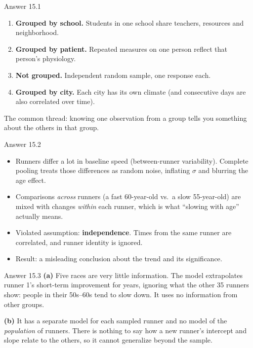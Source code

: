 \documentclass[aspectratio=43,11pt]{beamer}
\begin{document}
\begin{frame}{Answer 15.1}
  \begin{enumerate}
    \item \textbf{Grouped by school.} Students in one school share
      teachers, resources and neighborhood.
    \item \textbf{Grouped by patient.} Repeated measures on one person
      reflect that person's physiology.
    \item \textbf{Not grouped.} Independent random sample, one response
      each.
    \item \textbf{Grouped by city.} Each city has its own climate (and
      consecutive days are also correlated over time).
  \end{enumerate}
  \vspace{0.4em}
  The common thread: knowing one observation from a group tells you
  something about the others in that group.
\end{frame}
\begin{frame}{Answer 15.2}
  \begin{itemize}
    \item Runners differ a lot in baseline speed (between-runner
      variability). Complete pooling treats those differences as random
      noise, inflating $\sigma$ and blurring the age effect.
    \item Comparisons \emph{across} runners (a fast 60-year-old vs.\ a slow
      55-year-old) are mixed with changes \emph{within} each runner, which
      is what ``slowing with age'' actually means.
    \item Violated assumption: \textbf{independence}. Times from the same
      runner are correlated, and runner identity is ignored.
    \item Result: a misleading conclusion about the trend and its
      significance.
  \end{itemize}
\end{frame}

\begin{frame}{Answer 15.3}
  \textbf{(a)} Five races are very little information. The model
  extrapolates runner 1's short-term improvement for years, ignoring
  what the other 35 runners show: people in their 50s--60s tend to slow
  down. It uses no information from other groups.
  \vspace{0.6em}

  \textbf{(b)} It has a separate model for each sampled runner and no model
  of the \emph{population} of runners. There is nothing to say how a new
  runner's intercept and slope relate to the others, so it cannot
  generalize beyond the sample.
\end{frame}
\end{document}

